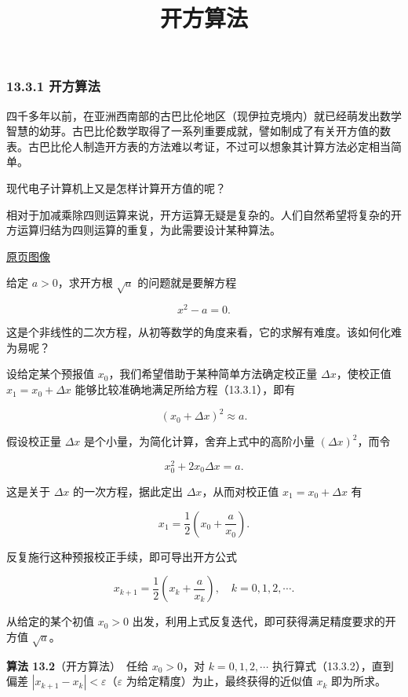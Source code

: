\documentclass[
  10pt,
  fontset=fandol]{ctexart}
\title{开方算法}
\author{}
\date{}
\begin{document}
\maketitle

\subsubsection{13.3.1 开方算法}\label{ux5f00ux65b9ux7b97ux6cd5}

四千多年以前，在亚洲西南部的古巴比伦地区（现伊拉克境内）就已经萌发出数学智慧的幼芽。古巴比伦数学取得了一系列重要成就，譬如制成了有关开方值的数表。古巴比伦人制造开方表的方法难以考证，不过可以想象其计算方法必定相当简单。

现代电子计算机上又是怎样计算开方值的呢？

相对于加减乘除四则运算来说，开方运算无疑是复杂的。人们自然希望将复杂的开方运算归结为四则运算的重复，为此需要设计某种算法。

\href{../../source-images/pdf-312.jpeg}{原页图像}

给定 \(a>0\)，求开方根 \(\sqrt{a}\) 的问题就是要解方程

\[
x^2-a=0.
\tag{13.3.1}
\]

这是个非线性的二次方程，从初等数学的角度来看，它的求解有难度。该如何化难为易呢？

设给定某个预报值 \(x_0\)，我们希望借助于某种简单方法确定校正量 \(\Delta x\)，使校正值 \(x_1=x_0+\Delta x\) 能够比较准确地满足所给方程（13.3.1），即有

\[
(x_0+\Delta x)^2\approx a.
\]

假设校正量 \(\Delta x\) 是个小量，为简化计算，舍弃上式中的高阶小量 \((\Delta x)^2\)，而令

\[
x_0^2+2x_0\Delta x=a.
\]

这是关于 \(\Delta x\) 的一次方程，据此定出 \(\Delta x\)，从而对校正值 \(x_1=x_0+\Delta x\) 有

\[
x_1=\frac{1}{2}\left(x_0+\frac{a}{x_0}\right).
\]

反复施行这种预报校正手续，即可导出开方公式

\[
x_{k+1}=\frac{1}{2}\left(x_k+\frac{a}{x_k}\right),\quad k=0,1,2,\cdots.
\tag{13.3.2}
\]

从给定的某个初值 \(x_0>0\) 出发，利用上式反复迭代，即可获得满足精度要求的开方值 \(\sqrt{a}\)。

\textbf{算法 13.2}（开方算法）　任给 \(x_0>0\)，对 \(k=0,1,2,\cdots\) 执行算式（13.3.2），直到偏差 \(|x_{k+1}-x_k|<\varepsilon\)（\(\varepsilon\) 为给定精度）为止，最终获得的近似值 \(x_k\) 即为所求。
\end{document}
